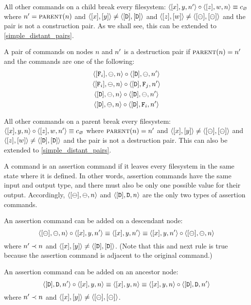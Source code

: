 \begin{myax}\label{ax_directchild_breaks}
All other commands on a child break every filesystem:
$\cxynnv\cc\czwnv \equiv \cbrk$ where $\nn=\parent(n)$ and $\cxy\neq\cdd$ and $\czw\neq\cbb$
and the pair is not a construction pair.
As we shall see, this can be extended to \cref{simple_distant_pairs}.
\end{myax}

\begin{mydef}
A pair of commands on nodes $n$ and $\nn$ is a destruction pair if $\parent(n)=\nn$ and the commands are one
of the following:
   \begin{gather*}
            \cfba{n}\cc  \cdba{\nn} \\
            \cfba{n}\cc  \caaa{\vald}{\valff}{\nn} \\
            \cdba{n}\cc  \cdba{\nn} \\
            \cdba{n}\cc  \cdfaa{\nn}
   \end{gather*}
\end{mydef}

\begin{myax}\label{ax_directparent_breaks}
All other commands on a parent break every filesystem:
$\cxynv\cc\czwnnv \equiv \cbrk$ where $\parent(n)=\nn$ and $\cxy\neq\cbb$ and $\czw\neq\cdd$
and the pair is not a destruction pair.
This can also be extended to \cref{simple_distant_pairs}.
\end{myax}

\begin{mydef}
A command is an assertion command if
it leaves every filesystem in the same state
where it is defined.
In other words, assertion commands have the same input and output type,
and there must also be only one possible value for their output.
Accordingly, $\cbba{n}$ and $\cdda{n}$ are the only two types of assertion commands.
\end{mydef}

\begin{myax}\label{ax_child_assert}
An assertion command can be added on a descendant node:
\[ \cbba{n}\cc\cxynnv \equiv \cxynnv \equiv \cxynnv\cc\cbba{n} \] 
where $\nn\descendant n$ and $\cxy\neq\cdd$.
(Note that this and next rule is true because the assertion command is
adjacent to the original command.)
\end{myax}

\begin{myax}\label{ax_parent_assert}
An assertion command can be added on an ancestor node:
\[ \cdda{\nn}\cc\cxynv \equiv \cxynv \equiv \cxynv\cc\cdda{\nn} \]
where $\nn\descendant n$ and $\cxy\neq\cbb$.
\end{myax}


